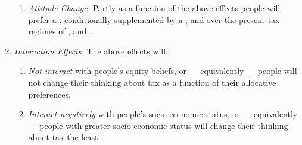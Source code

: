 \begin{enumerate}
\begin{enumerate}
				
				
			\item \label{itm:attitude-change}
				\emph{Attitude Change.}
				Partly as a function of the above effects %
				 people will prefer a , conditionally supplemented by a ,  and  over the present tax regimes of ,  and .
		\end{enumerate}
	
	\item \label{itm:interaction-effects}
		\emph{Interaction Effects.}
		The above effects will:
			\begin{enumerate}
				\item \label{itm:interact-equity}
					\emph{Not interact} with people's equity beliefs, or --- equivalently --- people will not change their thinking about tax as a function of their allocative preferences.
				\item \label{itm:interact-ses}
					\emph{Interact negatively} with people's socio-economic status, or --- equivalently --- people with greater socio-economic status will change their thinking about tax the least.
			\end{enumerate}
\end{enumerate}
    

